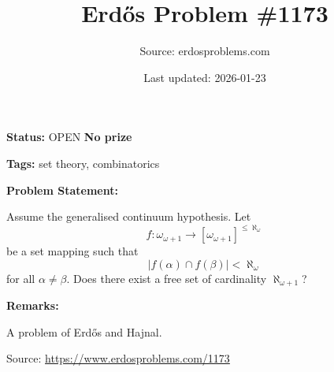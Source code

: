 \documentclass{article}
\title{Erd\H{o}s Problem \#1173}
\date{Last updated: 2026-01-23}
\author{Source: erdosproblems.com}
\begin{document}
\maketitle

\noindent\textbf{Status:} OPEN \quad \textbf{No prize}

\noindent\textbf{Tags:} set theory, combinatorics

\medskip
\noindent\textbf{Problem Statement:}

Assume the generalised continuum hypothesis. Let\[f: \omega_{\omega+1}\to [\omega_{\omega+1}]^{\leq \aleph_\omega}\]be a set mapping such that\[\lvert f(\alpha)\cap f(\beta)\rvert <\aleph_\omega\]for all $\alpha\neq \beta$. Does there exist a free set of cardinality $\aleph_{\omega+1}$?

\bigskip
\noindent\textbf{Remarks:}

A problem of Erd\H{o}s and Hajnal.

\bigskip
\noindent\small{Source: \url{https://www.erdosproblems.com/1173}}
\end{document}
